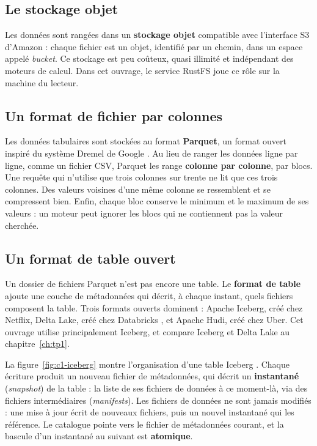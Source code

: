 \subsection{Le stockage objet}

Les données sont rangées dans un \textbf{stockage objet} compatible avec
l'interface S3 d'Amazon : chaque fichier est un objet, identifié par un chemin, dans un espace
appelé \emph{bucket}. Ce stockage est peu coûteux, quasi illimité et indépendant des moteurs de
calcul. Dans cet ouvrage, le service RustFS joue ce rôle sur la machine du lecteur.

\subsection{Un format de fichier par colonnes}

Les données tabulaires sont stockées au format \textbf{Parquet}, un format ouvert
inspiré du système Dremel de Google \citep{melnik2010}. Au lieu de ranger les données ligne par
ligne, comme un fichier CSV, Parquet les range \textbf{colonne par colonne}, par blocs. Une requête
qui n'utilise que trois colonnes sur trente ne lit que ces trois colonnes. Des valeurs voisines
d'une même colonne se ressemblent et se compressent bien. Enfin, chaque bloc conserve le minimum
et le maximum de ses valeurs : un moteur peut ignorer les blocs qui ne contiennent pas la valeur
cherchée.

\subsection{Un format de table ouvert}\label{sec:c1-formats}

Un dossier de fichiers Parquet n'est pas encore une table. Le \textbf{format de
table} ajoute une couche de métadonnées qui décrit, à chaque instant, quels
fichiers composent la table. Trois formats ouverts dominent : Apache Iceberg, créé chez Netflix,
Delta Lake, créé chez Databricks \citep{armbrust2020}, et Apache Hudi, créé chez Uber. Cet ouvrage
utilise principalement Iceberg, et compare Iceberg et Delta Lake au chapitre~\ref{ch:tp1}.

La figure~\ref{fig:c1-iceberg} montre l'organisation d'une table Iceberg \citep{icebergspec}.
Chaque écriture produit un nouveau fichier de métadonnées, qui décrit un \textbf{instantané}
(\emph{snapshot}) de la table : la liste de ses fichiers de données à ce moment-là,
via des fichiers intermédiaires (\emph{manifests}). Les fichiers de données ne sont jamais
modifiés : une mise à jour écrit de nouveaux fichiers, puis un nouvel instantané qui les
référence. Le catalogue pointe vers le fichier de métadonnées courant, et la bascule d'un
instantané au suivant est \textbf{atomique}.

